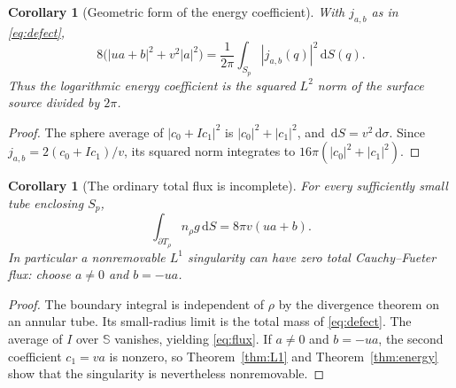 \documentclass[11pt,a4paper]{article}
\numberwithin{equation}{section}
\newtheorem{corollary}[theorem]{Corollary}
\theoremstyle{definition}
\theoremstyle{remark}
\newcommand{\SSS}{\mathbb S}
\newcommand{\dd}{\,\mathrm d}
\begin{document}
\begin{corollary}[Geometric form of the energy coefficient]
\label{cor:source-energy}
With $j_{a,b}$ as in \eqref{eq:defect},
\begin{equation}
 8\bigl(|ua+b|^2+v^2|a|^2\bigr)
 =\frac1{2\pi}\int_{S_p}|j_{a,b}(q)|^2\dd S(q).
 \label{eq:source-energy}
\end{equation}
Thus the logarithmic energy coefficient is the squared $L^2$ norm of the
surface source divided by $2\pi$.
\end{corollary}
\begin{proof}
The sphere average of $|c_0+I c_1|^2$ is $|c_0|^2+|c_1|^2$, and
$\dd S=v^2\dd\sigma$. Since $j_{a,b}=2(c_0+I c_1)/v$, its squared norm
integrates to $16\pi(|c_0|^2+|c_1|^2)$.
\end{proof}

\begin{corollary}[The ordinary total flux is incomplete]
\label{cor:flux}
For every sufficiently small tube enclosing $S_p$,
\begin{equation}
 \int_{\partial T_\rho}n_\rho g\dd S=8\pi v(ua+b).
 \label{eq:flux}
\end{equation}
In particular a nonremovable $L^1$ singularity can have zero total
Cauchy--Fueter flux: choose $a\ne0$ and $b=-ua$.
\end{corollary}
\begin{proof}
The boundary integral is independent of $\rho$ by the divergence theorem on
an annular tube. Its small-radius limit is the total mass of
\eqref{eq:defect}. The average of $I$ over $\SSS$ vanishes, yielding
\eqref{eq:flux}. If $a\ne0$ and $b=-ua$, the second coefficient $c_1=va$
is nonzero, so Theorem~\ref{thm:L1} and Theorem~\ref{thm:energy} show that the
singularity is nevertheless nonremovable.
\end{proof}
\end{document}
